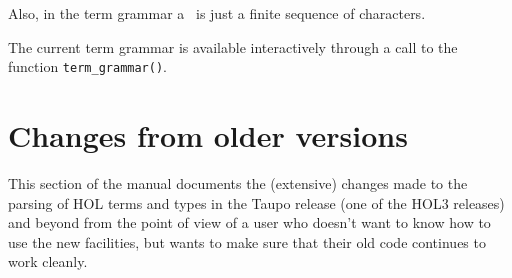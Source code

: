 {Also, in the term grammar a \charseq\ is just a finite sequence of
characters.

The current term grammar is available interactively through a call to
the function \texttt{term\_grammar()}.


\section{Changes from older versions}

This section of the manual documents the (extensive) changes made to
the parsing of HOL terms and types in the Taupo release (one of the
HOL3 releases) and beyond from the point of view of a user who doesn't
want to know how to use the new facilities, but wants to make sure
that their old code continues to work cleanly.

}
